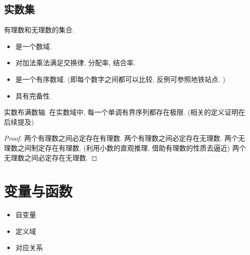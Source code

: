 \begin{comment}
    这里学习的关键在于学会了
    \item 反证法
    \item 利用定义进行逻辑推理. 
\end{comment}

\subsection{实数集}

\begin{definition}[实数集的定义]
    有理数和无理数的集合. 
\end{definition}

\begin{definition}[实数性质]
    \begin{itemize}
        \item 是一个数域. 
        \item 对加法乘法满足交换律, 分配率, 结合率. 
        \item 是一个有序数域. (即每个数字之间都可以比较, 反例可参照地铁站点. )
        \item 具有完备性. 
    \end{itemize}
\end{definition}

\begin{definition}[实数的完备性]
    实数布满数轴. 
    在实数域中, 每一个单调有界序列都存在极限. (相关的定义证明在后续提及)
\end{definition}

\begin{proof}
    两个有理数之间必定存在有理数. 
    两个有理数之间必定存在无理数. 
    两个无理数之间制定存在有理数. (利用小数的直观推理, 借助有理数的性质去逼近)
    两个无理数之间必定存在无理数. 
\end{proof}

\section{变量与函数}

\begin{definition}[函数的定义]
    \begin{itemize}
        \item 自变量
        \item 定义域
        \item 对应关系
    \end{itemize}
\end{definition}


